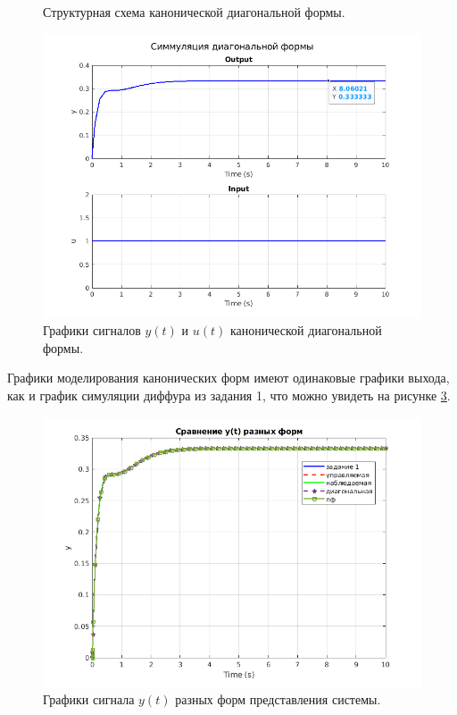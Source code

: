 \begin{enumerate}
\begin{figure}[htbp]
        \caption{Структурная схема канонической диагональной формы.}
        \label{fig:task2_slx_diag}
    \end{figure}
    \begin{figure}[htbp]
        \centering
        \includegraphics[width=0.9\linewidth]{figs/task_2_out_diag_y.png}
        \caption{Графики сигналов $y(t)$ и $u(t)$ канонической диагональной формы.}
        \label{fig:task2_out_diag_y}
    \end{figure}
\end{enumerate}

Графики моделирования канонических форм имеют одинаковые графики выхода,
как и график симуляции диффура из задания 1, что можно увидеть на рисунке \ref{fig:task2_out_y_comp}.
\begin{figure}[htbp]
    \centering
    \includegraphics[width=0.9\linewidth]{figs/task_2_out_y_comp.png}
    \caption{Графики сигнала $y(t)$ разных форм представления системы.}
    \label{fig:task2_out_y_comp}
\end{figure}



